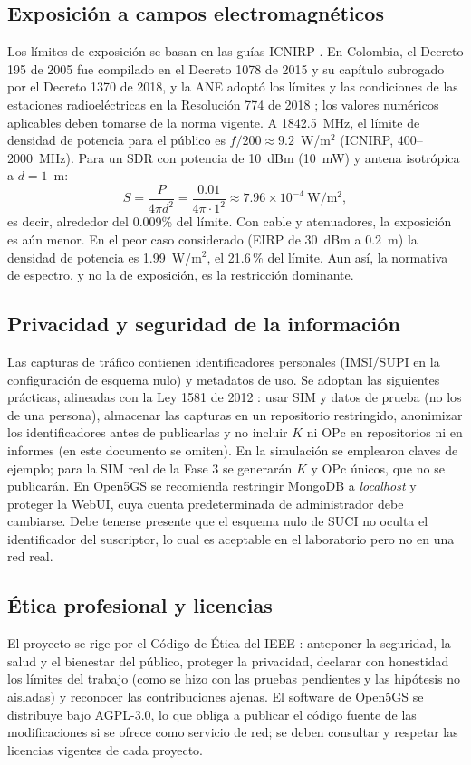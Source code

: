 \documentclass[conference]{IEEEtran}
\begin{document}
\subsection{Exposición a campos electromagnéticos}
Los límites de exposición se basan en las guías ICNIRP \cite{icnirp}. En Colombia, el Decreto 195 de 2005 \cite{decreto195} fue compilado en el Decreto 1078 de 2015 y su capítulo subrogado por el Decreto 1370 de 2018, y la ANE adoptó los límites y las condiciones de las estaciones radioeléctricas en la Resolución 774 de 2018 \cite{ane774}; los valores numéricos aplicables deben tomarse de la norma vigente. A 1842.5~MHz, el límite de densidad de potencia para el público es $f/200\approx9.2$~W/m$^2$ (ICNIRP, 400--2000~MHz). Para un SDR con potencia de 10~dBm (10~mW) y antena isotrópica a $d=1$~m:
\begin{equation}
S=\frac{P}{4\pi d^{2}}=\frac{0.01}{4\pi\cdot1^{2}}\approx7.96\times10^{-4}~\mathrm{W/m^{2}},
\end{equation}
es decir, alrededor del 0.009\% del límite. Con cable y atenuadores, la exposición es aún menor. En el peor caso considerado (EIRP de 30~dBm a 0.2~m) la densidad de potencia es 1.99~W/m$^2$, el 21.6\,\% del límite. Aun así, la normativa de espectro, y no la de exposición, es la restricción dominante.

\subsection{Privacidad y seguridad de la información}
Las capturas de tráfico contienen identificadores personales (IMSI/SUPI en la configuración de esquema nulo) y metadatos de uso. Se adoptan las siguientes prácticas, alineadas con la Ley 1581 de 2012 \cite{ley1581}: usar SIM y datos de prueba (no los de una persona), almacenar las capturas en un repositorio restringido, anonimizar los identificadores antes de publicarlas y no incluir $K$ ni OPc en repositorios ni en informes (en este documento se omiten). En la simulación se emplearon claves de ejemplo; para la SIM real de la Fase 3 se generarán $K$ y OPc únicos, que no se publicarán. En Open5GS se recomienda restringir MongoDB a \textit{localhost} y proteger la WebUI, cuya cuenta predeterminada de administrador debe cambiarse. Debe tenerse presente que el esquema nulo de SUCI no oculta el identificador del suscriptor, lo cual es aceptable en el laboratorio pero no en una red real.

\subsection{Ética profesional y licencias}
El proyecto se rige por el Código de Ética del IEEE \cite{ieeeethics}: anteponer la seguridad, la salud y el bienestar del público, proteger la privacidad, declarar con honestidad los límites del trabajo (como se hizo con las pruebas pendientes y las hipótesis no aisladas) y reconocer las contribuciones ajenas. El software de Open5GS se distribuye bajo AGPL-3.0, lo que obliga a publicar el código fuente de las modificaciones si se ofrece como servicio de red; se deben consultar y respetar las licencias vigentes de cada proyecto.
\end{document}
